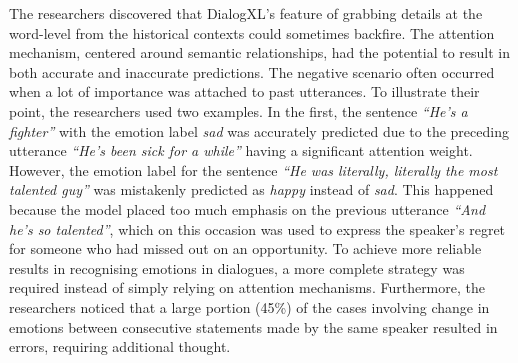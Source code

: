 The researchers discovered that DialogXL's feature of grabbing details at the word-level from the historical contexts could sometimes backfire. The attention mechanism, centered around semantic relationships, had the potential to result in both accurate and inaccurate predictions. The negative scenario often occurred when a lot of importance was attached to past utterances. To illustrate their point, the researchers used two examples. In the first, the sentence \textit{``He's a fighter''} with the emotion label \textit{sad} was accurately predicted due to the preceding utterance \textit{``He's been sick for a while''} having a significant attention weight. However, the emotion label for the sentence \textit{``He was literally, literally the most talented guy''} was mistakenly predicted as \textit{happy} instead of \textit{sad}. This happened because the model placed too much emphasis on the previous utterance \textit{``And he's so talented''}, which on this occasion was used to express the speaker's regret for someone who had missed out on an opportunity. To achieve more reliable results in recognising emotions in dialogues, a more complete strategy was required instead of simply relying on attention mechanisms. Furthermore, the researchers noticed that a large portion (45\%) of the cases involving change in emotions between consecutive statements made by the same speaker resulted in errors, requiring additional thought.


